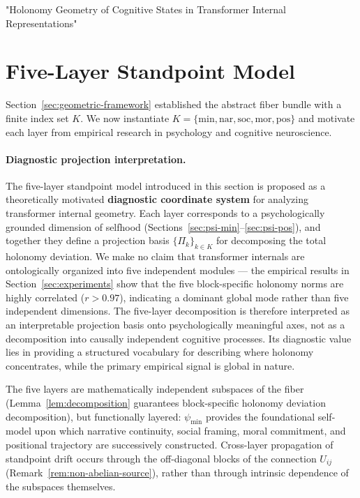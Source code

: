 "Holonomy Geometry of Cognitive States in Transformer Internal Representations"

\section{Five-Layer Standpoint Model}
\label{sec:five-layer}

Section~\ref{sec:geometric-framework} established the abstract fiber bundle with a
finite index set $K$. We now instantiate $K = \{\mathrm{min}, \mathrm{nar},
\mathrm{soc}, \mathrm{mor}, \mathrm{pos}\}$ and motivate each layer from empirical
research in psychology and cognitive neuroscience.

\paragraph{Diagnostic projection interpretation.}
The five-layer standpoint model introduced in this section is proposed as a theoretically
motivated \textbf{diagnostic coordinate system} for analyzing transformer internal
geometry. Each layer corresponds to a psychologically grounded dimension of selfhood
(Sections~\ref{sec:psi-min}--\ref{sec:psi-pos}), and together they define a projection
basis $\{\Pi_k\}_{k \in K}$ for decomposing the total holonomy deviation. We make no claim
that transformer internals are ontologically organized into five independent modules ---
the empirical results in Section~\ref{sec:experiments} show that the five block-specific
holonomy norms are highly correlated ($r > 0.97$), indicating a dominant global mode
rather than five independent dimensions. The five-layer decomposition is therefore
interpreted as an interpretable projection basis onto psychologically meaningful axes, not
as a decomposition into causally independent cognitive processes. Its diagnostic value
lies in providing a structured vocabulary for describing where holonomy concentrates, while
the primary empirical signal is global in nature.

The five layers are mathematically independent subspaces of the fiber
(Lemma~\ref{lem:decomposition} guarantees block-specific holonomy deviation
decomposition), but functionally layered: $\psi_{\mathrm{min}}$ provides the
foundational self-model upon which narrative continuity, social framing, moral commitment,
and positional trajectory are successively constructed. Cross-layer propagation of
standpoint drift occurs through the off-diagonal blocks of the connection $U_{ij}$
(Remark~\ref{rem:non-abelian-source}), rather than through intrinsic dependence of the
subspaces themselves.

